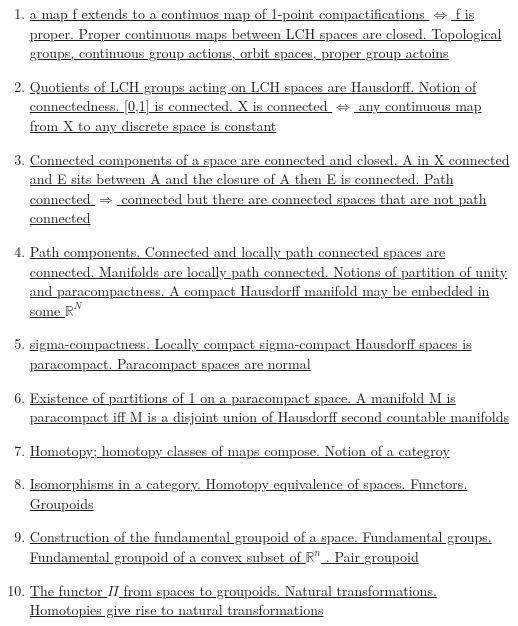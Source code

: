 \documentclass[11pt]{article}
\begin{document}
\begin{enumerate}
	\item \href{https://mp.weixin.qq.com/s/AXHH_4TEnp1RI6CMa5ThCw}{a map f extends to a continuos map of 1-point compactifications $\Leftrightarrow$ f is proper. Proper continuous maps between LCH spaces are closed. Topological groups, continuous group actions, orbit spaces, proper group actoins}	%
	\item \href{https://mp.weixin.qq.com/s/uDg064NRu44Li6R28FVc7g}{Quotients of LCH groups acting on LCH spaces are Hausdorff. Notion of connectedness. [0,1] is connected. X is connected $\Leftrightarrow$ any continuous map from X to any discrete space is constant}	%
	\item \href{https://mp.weixin.qq.com/s/RoclA358UdCYue4nbT71pA}{Connected components of a space are connected and closed. A in X connected and E sits between A and the closure of A then E is connected. Path connected $\Rightarrow$ connected but there are connected spaces that are not path connected}	%
	\item \href{https://mp.weixin.qq.com/s/W2omCNXIDSlkv3SjoqXV-g}{Path components. Connected and locally path connected spaces are connected. Manifolds are locally path connected. Notions of partition of unity and paracompactness. A compact Hausdorff manifold may be embedded in some $\mathbb{R}^N$}	%
	\item \href{https://mp.weixin.qq.com/s/aFdVoPlhNMPYKP7nUxS2ow}{sigma-compactness. Locally compact sigma-compact Hausdorff spaces is paracompact. Paracompact spaces are normal}	%
	\item \href{https://mp.weixin.qq.com/s/03IoaMrFbslVR1FNxnUhww}{Existence of partitions of 1 on a paracompact space. A manifold M is paracompact iff M is a disjoint union of Hausdorff second countable manifolds}	%
	\item \href{https://mp.weixin.qq.com/s/8jJIs_LhE_UPCym0I-TbFQ}{Homotopy; homotopy classes of maps compose. Notion of a categroy}	%
	\item \href{https://mp.weixin.qq.com/s/37GlOC0ff5_jXJAvb0LSRw}{Isomorphisms in a category. Homotopy equivalence of spaces. Functors. Groupoids}	%
	\item \href{https://mp.weixin.qq.com/s/4XQbPq5UWjKf2oD3yMAPVQ}{Construction of the fundamental groupoid of a space. Fundamental groups. Fundamental groupoid of a convex subset of $\mathbb{R}^{n}$ . Pair groupoid}	%
	\item \href{https://mp.weixin.qq.com/s/5OshKGMWrBzqU2RBjEJ1DQ}{The functor $\Pi$ from spaces to groupoids. Natural transformations. Homotopies give rise to natural transformations}	%

\end{enumerate}
\end{document}
